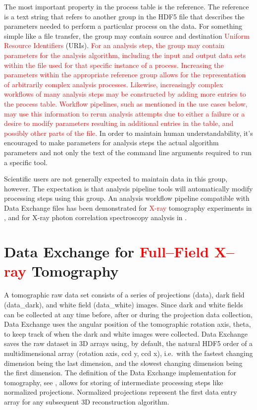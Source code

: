 \documentclass[pdf]{iucr}              %
\begin{document}
The most important property in the process table is the reference. The reference is a text string that refers to another group in the HDF5 file that describes the parameters needed to perform a particular process on the data. For something simple like a file transfer, the group may contain source and destination \textcolor{red}{Uniform Resource Identifiers} (URIs). \textcolor{red}{For an analysis step, the group may contain parameters for the analysis algorithm, including the input and output data sets within the file used for that specific instance of a process. Increasing the parameters within the appropriate reference group allows for the representation of arbitrarily complex analysis processes. Likewise, increasingly complex workflows of many analysis steps may be constructed by adding more entries to the process table. Workflow pipelines, such as mentioned in the use cases below, may use this information to rerun analysis attempts due to either a failure or a desire to modify parameters resulting in additional entries in the table, and possibly other parts of the file.} In order to maintain human understandability, it's encouraged to make parameters for analysis steps the actual algorithm parameters and not only the text of the command line arguments required to run a specific tool.

Scientific users are not generally expected to maintain data in this group, however. The expectation is that analysis pipeline tools will automatically modify processing steps using this group. An analysis workflow pipeline compatible with Data Exchange files has been demonstrated for \textcolor{red}{X-ray} tomography experiments in \cite{schwarz_icalepcs_2013}, and for X-ray photon correlation spectroscopy analysis in \cite{khan_icalepcs_2013}.

\section{Data Exchange for \textcolor{red}{Full--Field X--ray} Tomography}

A tomographic raw data set consists of a series of projections (data), dark field (data\_dark), and white field (data\_white) images. Since dark and white fields can be collected at any time before, after or during the projection data collection, Data Exchange uses the angular position of the tomographic rotation axis, theta, to keep track of when the dark and white images were collected. Data Exchange saves the raw dataset in 3D arrays using, by default, the natural HDF5 order of a multidimensional array (rotation axis, ccd y, ccd x), i.e.\  with the fastest changing dimension being the last dimension, and the slowest changing dimension being the first dimension. The definition of the Data Exchange implementation for tomography, see \cite{data_exchange}, allows for storing of intermediate processing steps like normalized projections. Normalized projections represent the first data entry array for any subsequent 3D reconstruction algorithm.
\end{document}

